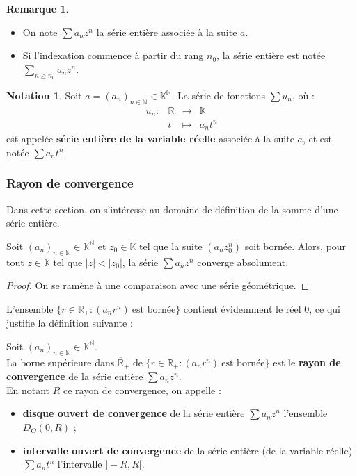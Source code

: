 \documentclass[french]{article}
\newcommand{\N}{\mathbb{N}}
\newcommand{\R}{\mathbb{R}}
\newcommand{\K}{\mathbb{K}}
\theoremstyle{plain}
\theoremstyle{definition}
\newtheorem*{rmq}{Remarque}
\newtheorem*{notation}{Notation}
\theoremstyle{remark}
\begin{document}
\begin{rmq}
	\begin{itemize}
		\item On note $\displaystyle\sum a_nz^n$ la série entière associée à la suite $a$.
		\item Si l'indexation commence à partir du rang $n_0$, la série entière est notée $\displaystyle\sum_{n\geqslant n_0}a_nz^n$.
	\end{itemize}
\end{rmq}

\begin{notation}
	Soit $a=(a_n)_{n\in\N}\in\K^\N$. La série de fonctions $\displaystyle\sum u_n$, où : $$\begin{array}{lrcl}
	u_n:&\R&\longrightarrow&\K\\
	&t&\longmapsto&a_nt^n
	\end{array}$$ est appelée \textbf{série entière de la variable réelle} associée à la suite $a$, et est notée $\displaystyle\sum a_nt^n$.
\end{notation}

\subsubsection*{Rayon de convergence}

Dans cette section, on s'intéresse au domaine de définition de la somme d'une série entière.

\begin{thm}%
	Soit $(a_n)_{n\in\N}\in\K^\N$ et $z_0\in\K$ tel que la suite $(a_nz_0^n)$ soit bornée. Alors, pour tout $z\in\K$ tel que $\lvert z\rvert <\lvert z_0\rvert$, la série $\displaystyle\sum a_nz^n$ converge absolument.
\end{thm}
\begin{proof}
	On se ramène à une comparaison avec une série géométrique.
\end{proof}

L'ensemble $\{r\in\R_+ : (a_nr^n)\ \text{est bornée}\}$ contient évidemment le réel $0$, ce qui justifie la définition suivante :

\begin{dfn}
	Soit $(a_n)_{n\in\N}\in\K^\N$.\\
	 La borne supérieure dans $\overline{\R}_+$ de $\{r\in\R_+ : (a_nr^n)\ \text{est bornée}\}$ est le \textbf{rayon de convergence} de la série entière $\displaystyle\sum a_n z^n$. \\
	 En notant $R$ ce rayon de convergence, on appelle : 
	 \begin{itemize}
	 	\item \textbf{disque ouvert de convergence} de la série entière $\displaystyle\sum a_nz^n$ l'ensemble $D_O(0,R)$ ;
	 	\item \textbf{intervalle ouvert de convergence} de la série entière (de la variable réelle) $\displaystyle\sum a_n t^n$ l'intervalle $]-R,R[$.
	 \end{itemize}
\end{dfn}
\end{document}
